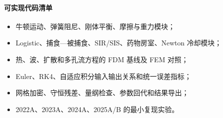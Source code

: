 \paragraph{可实现代码清单}
\begin{itemize}
  \item 牛顿运动、弹簧阻尼、刚体平衡、摩擦与重力模块；
  \item Logistic、捕食—被捕食、SIR/SIS、药物房室、Newton 冷却模块；
  \item 热、波、扩散和多孔流方程的 FDM 基线及 FEM 对照；
  \item Euler、RK4、自适应积分输入输出关系和统一误差指标；
  \item 网格加密、守恒残差、量纲检查、参数回代和结果导出；
  \item 2022A、2023A、2024A、2025A/B 的最小复现实验。
\end{itemize}

